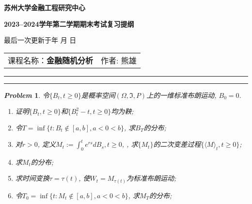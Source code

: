 \documentclass{article}
\newtheorem{problem}{\itshape Problem}
\renewcommand{\today}{\number\year 年 \number\month 月 \number\day 日}
\begin{document}
\vspace{1em}
\begin{center}
\textbf{\LARGE 苏州大学金融工程研究中心}\par
\vspace{8pt}
\textbf{\LARGE 2023--2024学年第二学期期末考试复习提纲}\par
\vspace{8pt}
最后一次更新于\today
\end{center}


\begin{center}
\begin{tabular}{m{} m{} m{}}
     课程名称：\textbf{金融随机分析} 
     & \multicolumn{2}{l}{作者: 熊雄}
\end{tabular}
\end{center}
\hrule height 1pt
\noindent
\rule{\textwidth}{1pt}


\begin{problem}
  令$\{B_t,t\ge 0\}$是概率空间$(\Omega, \mathfrak{I}, P)$上的一维标准布朗运动, $B_0 = 0$. 

  \begin{enumerate}[label=(\arabic*)]
  \item 证明$\{B_t,t\ge 0\}$和$\{B_t^2 - t,t\ge 0\}$均为鞅;
  \item 令$T = \inf \{t:B_t\notin [a,b],a<0<b\}$, 求$B_T$的分布;
  \item 对$r >0$, 定义$M_t := \int_0^t e^{rs} dB_s, t\ge 0$,  , 求$\{M_t\}$的二次变差过程$\{\langle M \rangle _t,t\ge 0\}$;
  \item 求$M_t$的分布;
  \item 求时间变换$\tau = \tau(t)$, 使$W_t = M_{\tau(t)}$为标准布朗运动;
  \item 令$T_0 = \inf\{t: M_t\notin [a,b], a<0<b\}$, 求$M_T$的分布;
   \end{enumerate}
  \end{problem}
\end{document}
